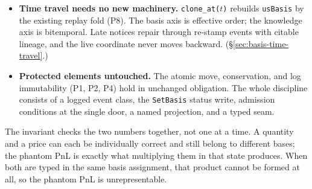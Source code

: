 \begin{itemize}[nosep]
read-only, versioned, and free of arithmetic. Raw observations flow in through the
single ingest door, where the ledger attaches the stamp. Door soundness (P25) admits
nothing whose stamped basis the log has not committed, and the stamp is a pure
function of pinned recorded data, so real-time, batch, and multi-vendor operation
coincide and no corporate-action logic can exist outside the ledger.
(\S\ref{sec:basis-contract}.)
\item \textbf{Time travel needs no new machinery.} \texttt{clone\_at($t$)} rebuilds
\texttt{usBasis} by the existing replay fold (P8). The basis axis is effective order;
the knowledge axis is bitemporal. Late notices repair through re-stamp events with
citable lineage, and the live coordinate never moves backward.
(\S\ref{sec:basis-time-travel}.)
\item \textbf{Protected elements untouched.} The atomic move, conservation, and log
immutability (P1, P2, P4) hold in unchanged obligation. The whole discipline consists
of a logged event class, the \texttt{SetBasis} status write, admission conditions at
the single door, a named projection, and a typed seam.
\end{itemize}

\noindent
The invariant checks the two numbers together, not one at a time. A quantity and a
price can each be individually correct and still belong to different bases; the phantom
PnL is exactly what multiplying them in that state produces. When both are typed in the
same basis assignment, that product cannot be formed at all, so the phantom PnL is
unrepresentable.
